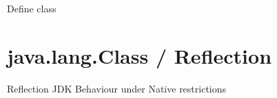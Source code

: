 Define class
\section{java.lang.Class / Reflection}
Reflection
JDK Behaviour under Native restrictions




